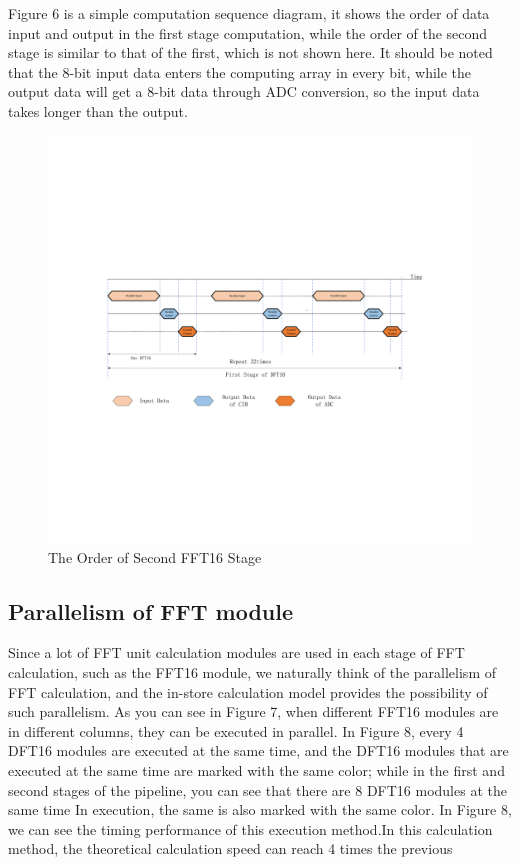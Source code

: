 \documentclass[journal]{IEEEtran}
\begin{document}
Figure 6 is a simple computation sequence diagram, it shows the order of data input and output in the first stage computation, while the order of the second stage is similar to that of the first, which is not shown here. It should be noted that the 8-bit input data enters the computing array in every bit, while the output data will get a 8-bit data through ADC conversion, so the input data takes longer than the output.

\begin{figure}[h]
\centering
\includegraphics[scale=0.2]{figures/figure6.pdf}
\caption{The Order of Second FFT16 Stage}
\end{figure}

\subsection{Parallelism of FFT module}

Since a lot of FFT unit calculation modules are used in each stage of FFT calculation, such as the FFT16 module, we naturally think of the parallelism of FFT calculation, and the in-store calculation model provides the possibility of such parallelism. As you can see in Figure 7, when different FFT16 modules are in different columns, they can be executed in parallel. In Figure 8, every 4 DFT16 modules are executed at the same time, and the DFT16 modules that are executed at the same time are marked with the same color; while in the first and second stages of the pipeline, you can see that there are 8 DFT16 modules at the same time In execution, the same is also marked with the same color. In Figure 8, we can see the timing performance of this execution method.In this calculation method, the theoretical calculation speed can reach 4 times the previous
\end{document}
